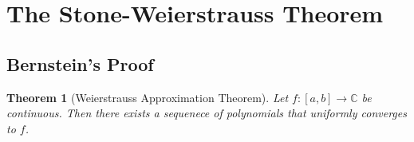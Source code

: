 \documentclass[11pt]{article}
\newtheorem{theorem}{Theorem}
\begin{document}

\section{The Stone-Weierstrauss Theorem}


\subsection{Bernstein's Proof}

\begin{theorem}[Weierstrauss Approximation Theorem]
  Let $f : [a, b] \to \mathbb{C}$ be continuous. Then there exists a sequenece of polynomials that uniformly converges to $f$.
\end{theorem}
\end{document}
